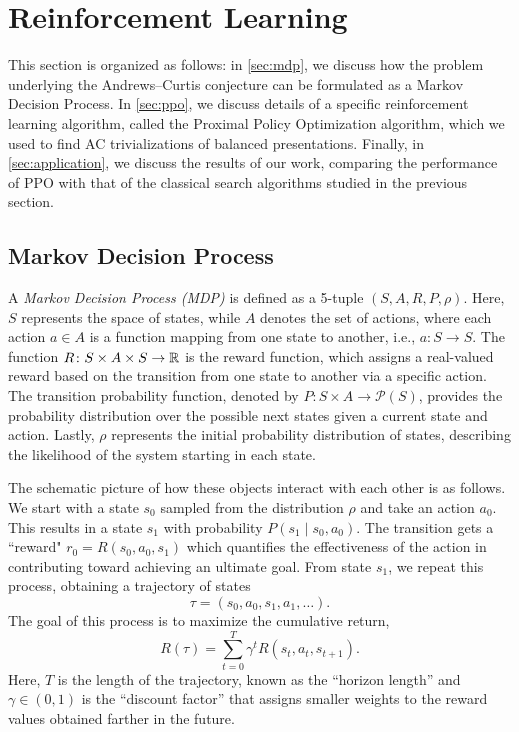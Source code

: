 
\section{Reinforcement Learning}\label{sec:rl}


This section is organized as follows: in \autoref{sec:mdp}, we discuss how the problem underlying the Andrews--Curtis conjecture can be formulated as a Markov Decision Process.
In \autoref{sec:ppo}, we discuss details of a specific reinforcement learning algorithm, called the Proximal Policy Optimization algorithm, which we used to find AC trivializations of balanced presentations.
Finally, in \autoref{sec:application}, we discuss the results of our work, comparing the performance of PPO with that of the classical search algorithms studied in the previous section.

\subsection{Markov Decision Process} \label{sec:mdp}

A \textit{Markov Decision Process (MDP)} is defined as a 5-tuple $(S, A, R, P, \rho)$. Here, $S$ represents the space of states, while $A$ denotes the set of actions, where each action $a \in A$ is a function mapping from one state to another, i.e., $a \colon S \to S$. The function $R \colon S \times A \times S \to \mathbb{R}$ is the reward function, which assigns a real-valued reward based on the transition from one state to another via a specific action. The transition probability function, denoted by $P \colon S \times A \to \mathcal{P}(S)$, provides the probability distribution over the possible next states given a current state and action. Lastly, $\rho$ represents the initial probability distribution of states, describing the likelihood of the system starting in each state.


The schematic picture of how these objects interact with each other is as follows. We start with a state $s_0$ sampled from the distribution $\rho$ and take an action $a_0$. This results in a state $s_1$ with probability $P(s_1 \mid s_0, a_0) $. The transition gets a ``reward" $r_0 = R(s_0, a_0, s_1)$ which quantifies the effectiveness of the action in contributing toward achieving an ultimate goal. From state $s_1$, we repeat this process, obtaining a trajectory of states
\[
\tau = \left( s_0, a_0, s_1, a_1, \dots \right).
\]
The goal of this process is to maximize the cumulative return,
\[
R(\tau) = \sum\limits_{t=0}^{T} \gamma^t R(s_t, a_t, s_{t+1}).
\]
Here, $T$ is the length of the trajectory, known as the ``horizon length'' and $\gamma \in \left(0, 1 \right)$ is the ``discount factor'' that assigns smaller weights to the reward values obtained farther in the future.

